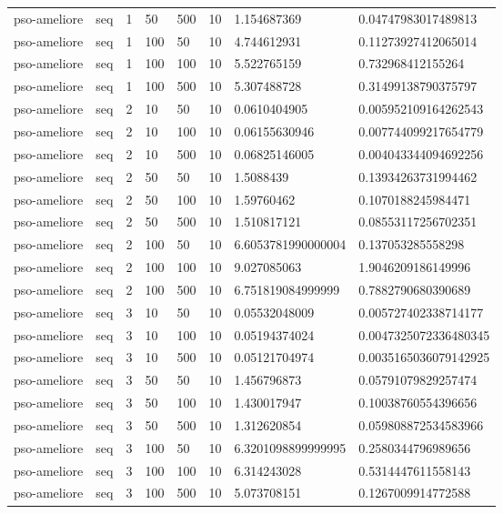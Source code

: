 \begin{table}[t]
\begin{tabular}{llllllll}
pso-ameliore & seq & 1 & 50 & 500 & 10 & 1.154687369 & 0.04747983017489813 \\
pso-ameliore & seq & 1 & 100 & 50 & 10 & 4.744612931 & 0.11273927412065014 \\
pso-ameliore & seq & 1 & 100 & 100 & 10 & 5.522765159 & 0.732968412155264 \\
pso-ameliore & seq & 1 & 100 & 500 & 10 & 5.307488728 & 0.31499138790375797 \\
pso-ameliore & seq & 2 & 10 & 50 & 10 & 0.0610404905 & 0.005952109164262543 \\
pso-ameliore & seq & 2 & 10 & 100 & 10 & 0.06155630946 & 0.007744099217654779 \\
pso-ameliore & seq & 2 & 10 & 500 & 10 & 0.06825146005 & 0.004043344094692256 \\
pso-ameliore & seq & 2 & 50 & 50 & 10 & 1.5088439 & 0.13934263731994462 \\
pso-ameliore & seq & 2 & 50 & 100 & 10 & 1.59760462 & 0.1070188245984471 \\
pso-ameliore & seq & 2 & 50 & 500 & 10 & 1.510817121 & 0.08553117256702351 \\
pso-ameliore & seq & 2 & 100 & 50 & 10 & 6.6053781990000004 & 0.137053285558298 \\
pso-ameliore & seq & 2 & 100 & 100 & 10 & 9.027085063 & 1.9046209186149996 \\
pso-ameliore & seq & 2 & 100 & 500 & 10 & 6.751819084999999 & 0.7882790680390689 \\
pso-ameliore & seq & 3 & 10 & 50 & 10 & 0.05532048009 & 0.005727402338714177 \\
pso-ameliore & seq & 3 & 10 & 100 & 10 & 0.05194374024 & 0.0047325072336480345 \\
pso-ameliore & seq & 3 & 10 & 500 & 10 & 0.05121704974 & 0.0035165036079142925 \\
pso-ameliore & seq & 3 & 50 & 50 & 10 & 1.456796873 & 0.05791079829257474 \\
pso-ameliore & seq & 3 & 50 & 100 & 10 & 1.430017947 & 0.10038760554396656 \\
pso-ameliore & seq & 3 & 50 & 500 & 10 & 1.312620854 & 0.059808872534583966 \\
pso-ameliore & seq & 3 & 100 & 50 & 10 & 6.3201098899999995 & 0.2580344796989656 \\
pso-ameliore & seq & 3 & 100 & 100 & 10 & 6.314243028 & 0.5314447611558143 \\
pso-ameliore & seq & 3 & 100 & 500 & 10 & 5.073708151 & 0.1267009914772588 \\

\end{tabular}
\end{table}
